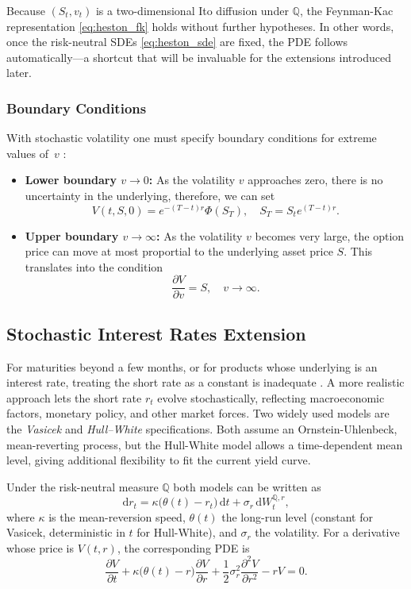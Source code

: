 \documentclass[12pt]{report} %
\theoremstyle{plain}           %
\theoremstyle{definition}      %
\theoremstyle{remark}          %
\begin{document}
Because $(S_t,v_t)$ is a two-dimensional Ito diffusion under $\mathbb Q$, the Feynman-Kac
representation \eqref{eq:heston_fk} holds without further hypotheses. In other words, once the
risk-neutral SDEs \eqref{eq:heston_sde} are fixed, the PDE follows automatically—a shortcut that
will be invaluable for the extensions introduced later.

\subsubsection{Boundary Conditions}

With stochastic volatility one must specify boundary conditions for extreme values of~$v$
\cite{duffy2022numerical}:

\begin{itemize}
	\item \textbf{Lower boundary $v\to0$:} As the volatility $v$ approaches zero, there is no uncertainty in the underlying, therefore, we can set
	\[
		V(t, S, 0) = e^{-(T-t)r}\Phi(S_T),\quad S_T = S_te^{(T-t)r}.
	\]
	\item \textbf{Upper boundary $v\to\infty$:} As the volatility $v$ becomes very large, the option price can move at most proportial to the underlying asset price $S$.
	This translates into the condition
	\[
		\frac{\partial V}{\partial v} = S, \quad v \to \infty.
	\]
\end{itemize}
\subsection{Stochastic Interest Rates Extension}\label{sec:sr_extension}

For maturities beyond a few months, or for products whose underlying is an interest rate, treating
the short rate as a constant is inadequate \cite{brigo2013interest}. A more realistic approach
lets the short rate \(r_t\) evolve stochastically, reflecting macroeconomic factors, monetary
policy, and other market forces.  Two widely used models are the \emph{Vasicek}
\cite{VASICEK1977177} and \emph{Hull--White} \cite{hullwhitemodel} specifications. Both assume an
Ornstein-Uhlenbeck, mean-reverting process, but the Hull-White model allows a
time-dependent mean level, giving additional flexibility to fit the current yield curve.

Under the risk-neutral measure \(\mathbb{Q}\) both models can be written as
\begin{equation}\label{eq:vasicek_sde}
  \mathrm{d}r_t
  = \kappa\bigl(\theta(t)-r_t\bigr)\,\mathrm{d}t
    + \sigma_r\,\mathrm{d}W_t^{\mathbb{Q},r},
\end{equation}
where \(\kappa\) is the mean-reversion speed, \(\theta(t)\) the long-run level
(constant for Vasicek, deterministic in \(t\) for Hull-White), and \(\sigma_r\) the volatility.
For a derivative whose price is \(V(t,r)\), the corresponding PDE is
\begin{equation}\label{eq:vasicek_pde}
  \frac{\partial V}{\partial t}
  + \kappa\bigl(\theta(t)-r\bigr)\frac{\partial V}{\partial r}
  + \frac12\sigma_r^{2}\frac{\partial^{2}V}{\partial r^{2}}
  - rV
  = 0.
\end{equation}
\end{document}
